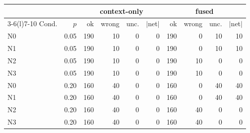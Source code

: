 \begin{tabular*}{\columnwidth}{@{\extracolsep{\fill}}lrrrrrrrrr@{}}
\toprule
 & & \multicolumn{4}{c}{context-only} & \multicolumn{4}{c}{fused} \\
\cmidrule(lr){3-6}\cmidrule(l){7-10}
Cond. & $p$ & ok & wrong & unc. & $|$net$|$ & ok & wrong & unc. & $|$net$|$ \\
\midrule
N0 & 0.05 & 190 & 10 & 0 & 0 & 190 & 0 & 10 & 10 \\
N1 & 0.05 & 190 & 10 & 0 & 0 & 190 & 0 & 10 & 10 \\
N2 & 0.05 & 190 & 10 & 0 & 0 & 190 & 10 & 0 & 0 \\
N3 & 0.05 & 190 & 10 & 0 & 0 & 190 & 10 & 0 & 0 \\
N0 & 0.20 & 160 & 40 & 0 & 0 & 160 & 0 & 40 & 40 \\
N1 & 0.20 & 160 & 40 & 0 & 0 & 160 & 0 & 40 & 40 \\
N2 & 0.20 & 160 & 40 & 0 & 0 & 160 & 40 & 0 & 0 \\
N3 & 0.20 & 160 & 40 & 0 & 0 & 160 & 40 & 0 & 0 \\
\bottomrule
\end{tabular*}
